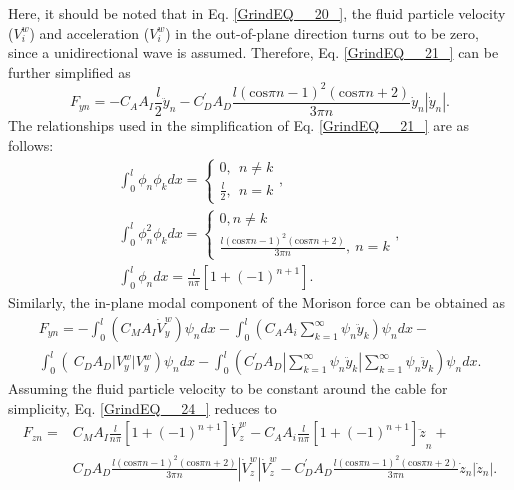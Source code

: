 \documentclass[review]{elsarticle}
\begin{document}
Here, it should be noted that in Eq. \eqref{GrindEQ__20_}, the fluid particle velocity ($V^w_i$) and acceleration ($V^w_i$) in the out-of-plane direction turns out to be zero, since a unidirectional wave is assumed. Therefore, Eq. \eqref{GrindEQ__21_} can be further simplified as 
\begin{equation} \label{GrindEQ__22_} 
F_{yn}=-C_AA_I\frac{l}{2}{\ddot{y}}_n-C^{'}_DA_D\frac{l{\left(\mathrm{cos}\pi n-1\right)}^2\left(\mathrm{cos}\pi n+2\right)}{3\pi n}{\dot{y}}_n\left|{\dot{y}}_n\right|.     
\end{equation} 
The relationships used in the simplification of Eq. \eqref{GrindEQ__21_} are as follows: 
\begin{equation} \label{GrindEQ__23_} 
\begin{split}
\int^l_0{{\phi }_n{\phi }_k}dx=\left\{ \begin{array}{c}
0,\ \ n\neq k \\ 
\frac{l}{2},\ \ n=k \end{array}
\right.,\\
\int^l_0{{\phi }^2_n{\phi }_k}dx=\left\{ \begin{array}{c}
0, n\neq k \\ 
\frac{l{(\mathrm{cos}\pi n-1)}^2(\mathrm{cos}\pi n+2)}{3\pi n},\ n=k \end{array}
\right.,\\
\int^l_0{{\phi }_n}dx=\frac{l}{n\pi }\left[1+{\left(-1\right)}^{n+1}\right]. 
\end{split}           
\end{equation} 
Similarly, the in-plane modal component of the Morison force can be obtained as
\begin{equation} \label{GrindEQ__24_}
\begin{split}
F_{yn}=-\int^l_0{\left(C_MA_I{\dot{V}}^w_y\right)}{\psi }_ndx-\int^l_0{\left(C_AA_i\sum^{\infty }_{k=1}{{\psi }_n}{\ddot{y}}_k\right)}{\psi }_ndx- \\ \int^l_0{\left({\ }{{C}}_{{D}}{{A}}_{{D}}{|}V^w_y{|}V^w_y\right)}{\psi }_ndx-\int^l_0{\left(C^{'}_DA_D\left|\sum^{\infty }_{k=1}{{\psi }_n}{\ddot{y}}_k\right|\sum^{\infty }_{k=1}{{\psi }_n}{\ddot{y}}_k\right)}{\psi }_ndx.
\end{split}
\end{equation}
Assuming the fluid particle velocity to be constant around the cable for simplicity, Eq. \eqref{GrindEQ__24_} reduces to
\begin{equation} \label{GrindEQ__25_}
\begin{split}
F_{zn}=&C_MA_I\frac{l}{n\pi }\left[1+{\left(-1\right)}^{n+1}\right]{\dot{V}}^w_z-C_AA_i\frac{l}{n\pi }{\left[1+{\left(-1\right)}^{n+1}\right]\ddot{z}}_n+ \\ &C_DA_D\frac{l{\left(\mathrm{cos}\pi n-1\right)}^2\left(\mathrm{cos}\pi n+2\right)}{3\pi n}\left|{\dot{V}}^w_z\right|{\dot{V}}^w_z-C^{'}_DA_D\frac{l{\left(\mathrm{cos}\pi n-1\right)}^2\left(\mathrm{cos}\pi n+2\right)}{3\pi n}{\dot{z}}_n\left|{\dot{z}}_n\right|.  
\end{split}
\end{equation} 
\end{document}
